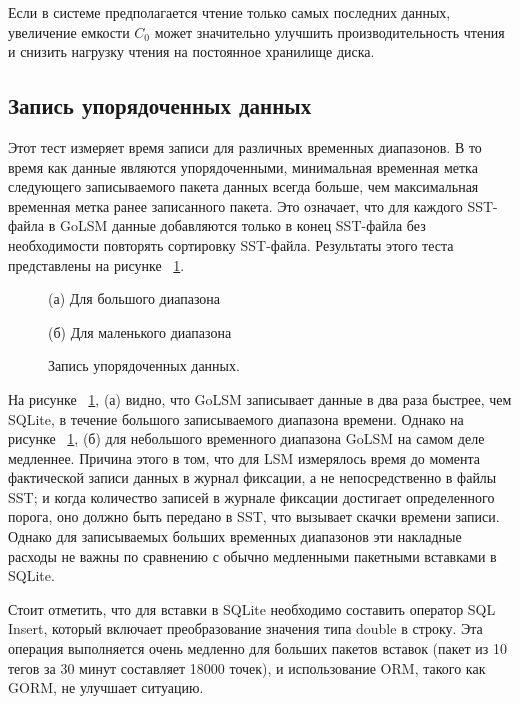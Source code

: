 Если в системе предполагается чтение только самых последних данных, увеличение емкости $C_0$ может значительно улучшить производительность чтения и снизить нагрузку чтения на постоянное хранилище диска.

\subsection{Запись упорядоченных данных}

Этот тест измеряет время записи для различных временных диапазонов. В то время как данные являются упорядоченными, минимальная временная метка следующего записываемого пакета данных всегда больше, чем максимальная временная метка ранее записанного пакета. Это означает, что для каждого SST-файла в GoLSM данные добавляются только в конец SST-файла без необходимости повторять сортировку SST-файла. Результаты этого теста представлены на рисунке ~\ref{fig6}.

\begin{figure}[!htb]
	\begin{minipage}{0.48\textwidth}
		\centering
		\resizebox{\textwidth}{!}{%
			
		}
		\label{figure}{(а) Для большого диапазона}
	\end{minipage}\hfill
	\begin{minipage}{0.48\textwidth}
		\centering
		\resizebox{\textwidth}{!}{%
			
		}
		\label{figure}{(б) Для маленького диапазона}
	\end{minipage}
	
	\caption{Запись упорядоченных данных.}\label{fig6}
\end{figure}

На рисунке ~\ref{fig6}, (а) видно, что GoLSM записывает данные в два раза быстрее, чем SQLite, в течение большого записываемого диапазона времени. Однако на рисунке ~\ref{fig6}, (б) для небольшого временного диапазона GoLSM на самом деле медленнее. Причина этого в том, что для LSM измерялось время до момента фактической записи данных в журнал фиксации, а не непосредственно в файлы SST; и когда количество записей в журнале фиксации достигает определенного порога, оно должно быть передано в SST, что вызывает скачки времени записи. Однако для записываемых больших временных диапазонов эти накладные расходы не важны по сравнению с обычно медленными пакетными вставками в SQLite.

Стоит отметить, что для вставки в SQLite необходимо составить оператор SQL Insert, который включает преобразование значения типа double в строку. Эта операция выполняется очень медленно для больших пакетов вставок (пакет из 10 тегов за 30 минут составляет 18000 точек), и использование ORM, такого как GORM, не улучшает ситуацию.

